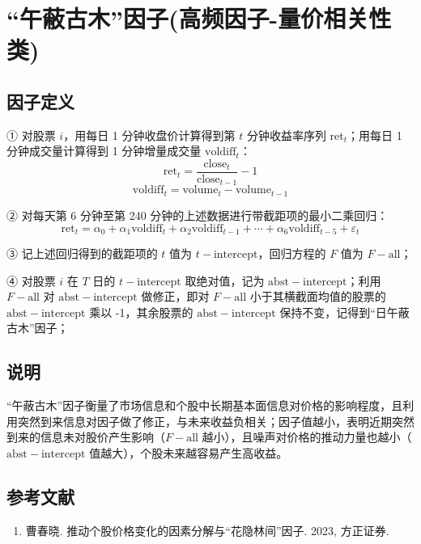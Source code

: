 \documentclass{article}
\begin{document}
\section{“午蔽古木”因子(高频因子-量价相关性类)}

\subsection{因子定义}

① 对股票 \( i \)，用每日 1 分钟收盘价计算得到第 \( t \) 分钟收益率序列 \( \mathrm{ret}_t \)；用每日 1 分钟成交量计算得到 1 分钟增量成交量 \( \mathrm{voldiff}_t \)：
\begin{equation}
    \mathrm{ret}_t = \frac{\mathrm{close}_t}{\mathrm{close}_{t-1}} - 1
\end{equation}
\begin{equation}
    \mathrm{voldiff}_t = \mathrm{volume}_t - \mathrm{volume}_{t-1}
\end{equation}

② 对每天第 6 分钟至第 240 分钟的上述数据进行带截距项的最小二乘回归：
\begin{equation}
    \mathrm{ret}_t = \alpha_0 + \alpha_1 \mathrm{voldiff}_t + \alpha_2 \mathrm{voldiff}_{t-1} + \cdots + \alpha_6 \mathrm{voldiff}_{t-5} + \varepsilon_t
\end{equation}

③ 记上述回归得到的截距项的 \( t \) 值为 \( t-{\mathrm{intercept}} \)，回归方程的 \( F \) 值为 \( F-{\mathrm{all}} \)；

④ 对股票 \( i \) 在 \( T \) 日的 \( t-{\mathrm{intercept}} \) 取绝对值，记为 \( \mathrm{abst}-{\mathrm{intercept}} \)；利用 \( F-{\mathrm{all}} \) 对 \( \mathrm{abst}-{\mathrm{intercept}} \) 做修正，即对 \( F-{\mathrm{all}} \) 小于其横截面均值的股票的 \( \mathrm{abst}-{\mathrm{intercept}} \) 乘以 -1，其余股票的 \( \mathrm{abst}-{\mathrm{intercept}} \) 保持不变，记得到“日午蔽古木”因子；

\subsection{说明}
“午蔽古木”因子衡量了市场信息和个股中长期基本面信息对价格的影响程度，且利用突然到来信息对因子做了修正，与未来收益负相关；因子值越小，表明近期突然到来的信息未对股价产生影响（\( F-{\mathrm{all}} \) 越小），且噪声对价格的推动力量也越小（\( \mathrm{abst}-{\mathrm{intercept}} \) 值越大），个股未来越容易产生高收益。

\subsection{参考文献}
\begin{enumerate}
    \item 曹春晓. 推动个股价格变化的因素分解与“花隐林间”因子. 2023, 方正证券.
\end{enumerate}
\end{document}
